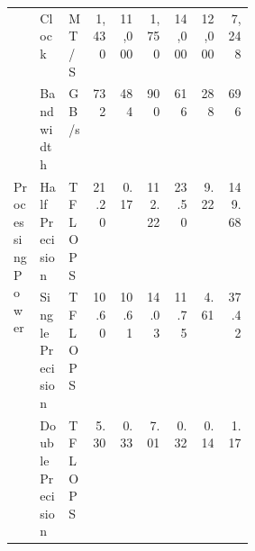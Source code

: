 \begin{tabular}{p{0.11\linewidth}p{0.12\linewidth}p{0.08\linewidth}rrrrrr}
    \cline{2-9}
                                                  & Clock                                & MT/S             & 1,430 & 11,000 & 1,750  & 14,000 & 12,000 & 7,248  \\
    \cline{2-9}
                                                  & Bandwidth                            & GB/s             & 732   & 484    & 900    & 616    & 288    & 696    \\
    \cline{1-9} \cline{2-9}
    \multirow[t]{3}{\linewidth}{Processing Power} & Half Precision                       & TFLOPS           & 21.20 & 0.17   & 112.22 & 23.50  & 9.22   & 149.68 \\
    \cline{2-9}
                                                  & Single Precision                     & TFLOPS           & 10.60 & 10.61  & 14.03  & 11.75  & 4.61   & 37.42  \\
    \cline{2-9}
                                                  & Double Precision                     & TFLOPS           & 5.30  & 0.33   & 7.01   & 0.32   & 0.14   & 1.17   \\
    \bottomrule
\end{tabular}
